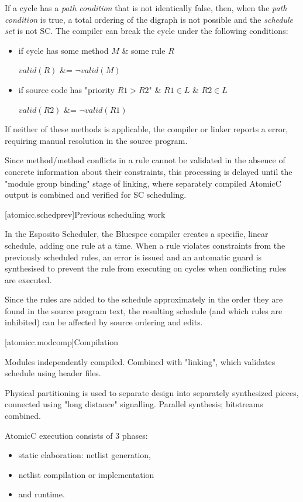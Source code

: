 If a cycle has a \textit{path condition} that is not identically false,
then, when the \textit{path condition} is true, a total ordering of
the digraph is not possible and the \textit{schedule set} is not SC.
The compiler can break the cycle under the following conditions:
\begin{itemize}
\item if cycle has some method $M$ \& some rule $R$

              $valid(R)$ \&= $\neg valid(M)$
\item if source code has "priority $R1 > R2$" \& $R1 \in L$ \& $R2 \in L$

              $valid(R2)$ \&= $\neg valid(R1)$
\end{itemize}
If neither of these methods is applicable, the compiler or linker
reports a error, requiring manual resolution in the source program.

Since method/method conflicts in a rule cannot be validated in the absence of
concrete information about their constraints,
this processing is delayed until the "module group binding"
stage of linking, where separately compiled AtomicC output is combined and
verified
for SC scheduling.

[atomicc.schedprev]{Previous scheduling work}

In the Esposito Scheduler\cite{Esposito:Patent},
the Bluespec compiler creates a specific, linear schedule, adding
one rule at a time.  When a rule violates constraints from the previously scheduled
rules, an error is issued and an automatic guard is synthesised to prevent the
rule from executing on cycles when conflicting rules are executed.

Since the rules are added to the schedule approximately in the order they are
found in the source program text, the resulting schedule (and which rules are
inhibited) can be affected by source ordering and edits.

[atomicc.modcomp]{Compilation}

Modules independently compiled.  Combined with "linking", which validates schedule using header files.

Physical partitioning is used to separate design into separately synthesized pieces, connected using
"long distance" signalling.  Parallel synthesis; bitstreams combined.

AtomicC execution consists of 3 phases:
\begin{itemize}
\item static elaboration: netlist generation, 
\item netlist compilation or implementation
\item and runtime.
\end{itemize}

